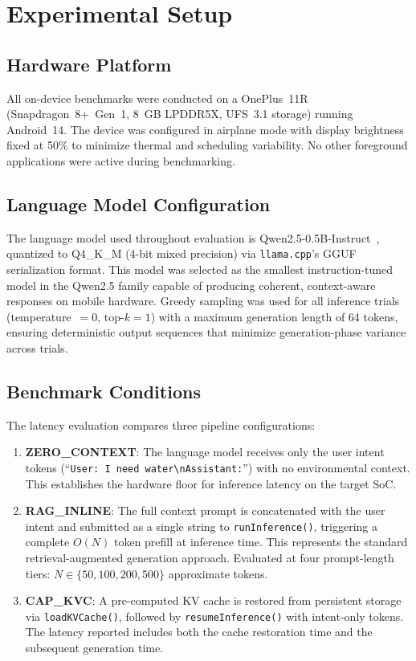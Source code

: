 \section{Experimental Setup}
\label{sec:experiments}

\subsection{Hardware Platform}
\label{sec:hardware}

All on-device benchmarks were conducted on a OnePlus~11R (Snapdragon~8+~Gen~1, 8~GB LPDDR5X, UFS~3.1 storage) running Android~14. The device was configured in airplane mode with display brightness fixed at 50\% to minimize thermal and scheduling variability. No other foreground applications were active during benchmarking.

\subsection{Language Model Configuration}
\label{sec:model_config}

The language model used throughout evaluation is Qwen2.5-0.5B-Instruct~\cite{qwen25}, quantized to Q4\_K\_M (4-bit mixed precision) via \texttt{llama.cpp}'s GGUF serialization format. This model was selected as the smallest instruction-tuned model in the Qwen2.5 family capable of producing coherent, context-aware responses on mobile hardware. Greedy sampling was used for all inference trials (temperature~$= 0$, top-$k = 1$) with a maximum generation length of 64 tokens, ensuring deterministic output sequences that minimize generation-phase variance across trials.

\subsection{Benchmark Conditions}
\label{sec:conditions}

The latency evaluation compares three pipeline configurations:

\begin{enumerate}
    \item \textbf{ZERO\_CONTEXT}: The language model receives only the user intent tokens (``\texttt{User: I need water\textbackslash nAssistant:}'') with no environmental context. This establishes the hardware floor for inference latency on the target SoC.

    \item \textbf{RAG\_INLINE}: The full context prompt is concatenated with the user intent and submitted as a single string to \texttt{runInference()}, triggering a complete $O(N)$ token prefill at inference time. This represents the standard retrieval-augmented generation approach. Evaluated at four prompt-length tiers: $N \in \{50, 100, 200, 500\}$ approximate tokens.

    \item \textbf{CAP\_KVC}: A pre-computed KV cache is restored from persistent storage via \texttt{loadKVCache()}, followed by \texttt{resumeInference()} with intent-only tokens. The latency reported includes both the cache restoration time and the subsequent generation time.
\end{enumerate}

